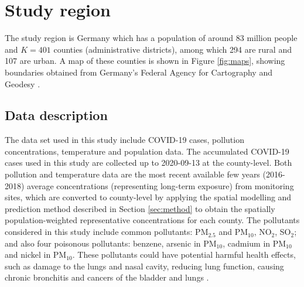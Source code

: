 \documentclass[12,]{article}
\begin{document}
\hypertarget{sec:studyRegion}{%
\section{Study region}\label{sec:studyRegion}}

The study region is Germany which has a population of around 83 million
people and \(K=401\) counties (administrative districts), among which
294 are rural and 107 are urban. A map of these counties is shown in
Figure \ref{fig:maps}, showing boundaries obtained from Germany's
Federal Agency for Cartography and Geodesy \autocite{BKG2020}.

\hypertarget{data-description}{%
\subsection{Data description}\label{data-description}}

The data set used in this study include COVID-19 cases, pollution
concentrations, temperature and population data. The accumulated
COVID-19 cases used in this study are collected up to 2020-09-13 at the
county-level. Both pollution and temperature data are the most recent
available few years (2016-2018) average concentrations (representing
long-term exposure) from monitoring sites, which are converted to
county-level by applying the spatial modelling and prediction method
described in Section \ref{sec:method} to obtain the spatially
population-weighted representative concentrations for each county. The
pollutants considered in this study include common pollutants:
PM\(_{2.5}\) and PM\(_{10}\), NO\(_{2}\), SO\(_2\); and also four
poisonous pollutants: benzene, arsenic in PM\(_{10}\), cadmium in
PM\(_{10}\) and nickel in PM\(_{10}\). These pollutants could have
potential harmful health effects, such as damage to the lungs and nasal
cavity, reducing lung function, causing chronic bronchitis and cancers
of the bladder and lungs
\autocites{Yu2002}{Smith2010}{Jarup1998}{Das2008}.
\end{document}
